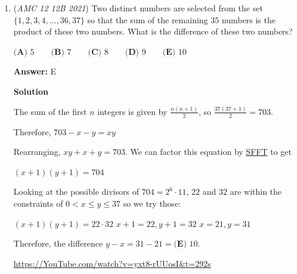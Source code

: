 \begin{enumerate}
 \textbf{Answer: }D



\textbf{Solution}

Note that $\log_{40}{2}=\frac{1}{\log_{2}{40}}$ and $\log_{20}{2}=\frac{1}{\log_{2}{20}}$. Letting $x = \log_2{20}$ and using the formula $\log{ab} = \log{a} + \log{b}$, we simplify to obtain
 \begin{align*} \frac{\log_{2}{80}}{\log_{40}{2}}-\frac{\log_{2}{160}}{\log_{20}{2}} &= \log_{2}{80}\cdot \log_{2}{40} - \log_{2}{160}\cdot \log_{2}{20}\\ &= (\log_{2}{4}+\log_{2}{20})(\log_{2}{2}+\log_{2}{20}) - (\log_{2}{8}+\log_{2}{20})\log_{2}{20}\\ &= (2+x)(1+x) - (3+x)x \\ &= 2+2x+x+x^2- 3x- x^2\\ &= \boxed{ \textbf{(D) }2 } \end{align*}
~ SoySoy4444

 


	\item (\textit{AMC 12 12B 2021}) Two distinct numbers are selected from the set $\{1,2,3,4,\dots,36,37\}$ so that the sum of the remaining $35$ numbers is the product of these two numbers. What is the difference of these two numbers?


 $\textbf{(A) }5 \qquad \textbf{(B) }7 \qquad \textbf{(C) }8\qquad \textbf{(D) }9 \qquad \textbf{(E) }10$

 \textbf{Answer: }E



\textbf{Solution}

The sum of the first $n$ integers is given by $\frac{n(n+1)}{2}$, so $\frac{37(37+1)}{2}=703$.

 Therefore, $703-x-y=xy$

 Rearranging, $xy+x+y=703$. We can factor this equation by \href{https://artofproblemsolving.com/wiki/index.php?title=SFFT}{SFFT} to get

 $(x+1)(y+1)=704$

 Looking at the possible divisors of $704 = 2^6\cdot11$, $22$ and $32$ are within the constraints of $0 < x \leq y \leq 37$ so we try those:

 $(x+1)(y+1) = 22\cdot32$
$x+1=22, y+1 = 32$
$x = 21, y = 31$

 Therefore, the difference $y-x=31-21=\boxed{\textbf{(E) }10}$.

 


 \href{https://YouTube.com/watch?v=yxt8-rUUosI&t=292s}{https://YouTube.com/watch?v=yxt8-rUUosI&t=292s}


\end{enumerate}
